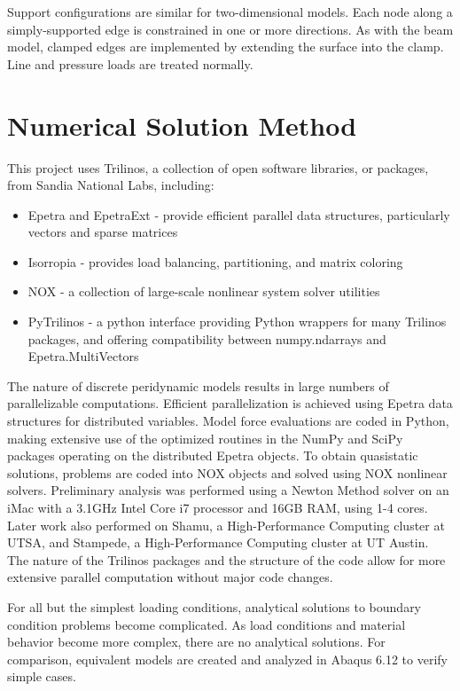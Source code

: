 Support configurations are similar for two-dimensional models.
Each node along a simply-supported edge is constrained in one or more directions.
As with the beam model, clamped edges are implemented by extending the surface into the clamp.
Line and pressure loads are treated normally.

\section{Numerical Solution Method}

This project uses Trilinos, a collection of open software libraries, or packages, from Sandia National Labs, including:
\begin{itemize}
  \item Epetra and EpetraExt - provide efficient parallel data structures, particularly vectors and sparse matrices
  \item Isorropia - provides load balancing, partitioning, and matrix coloring
  \item NOX - a collection of large-scale nonlinear system solver utilities
  \item PyTrilinos - a python interface providing Python wrappers for many Trilinos packages, and offering compatibility between numpy.ndarrays and Epetra.MultiVectors\cite{PyTrilinos}
\end{itemize}

The nature of discrete peridynamic models results in large numbers of parallelizable computations.
Efficient parallelization is achieved using Epetra data structures for distributed variables.
Model force evaluations are coded in Python, making extensive use of the optimized routines in the NumPy and SciPy packages operating on the distributed Epetra objects. 
To obtain quasistatic solutions, problems are coded into NOX objects and solved using NOX nonlinear solvers.
Preliminary analysis was performed using a Newton Method solver on an iMac with a 3.1GHz Intel Core i7 processor and 16GB RAM, using 1-4 cores.
Later work also performed on Shamu, a High-Performance Computing cluster at UTSA, and Stampede, a High-Performance Computing cluster at UT Austin.
The nature of the Trilinos packages and the structure of the code allow for more extensive parallel computation without major code changes.

For all but the simplest loading conditions, analytical solutions to boundary condition problems become complicated.
As load conditions and material behavior become more complex, there are no analytical solutions.
For comparison, equivalent models are created and analyzed in Abaqus 6.12 to verify simple cases. 
